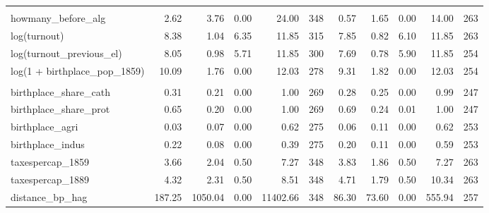 \begin{table}[!h]
\begin{threeparttable}
{\begin{tabular}[t]{lrrrrrrrrrr}
\addlinespace[0.3em]
\multicolumn{11}{l}{\textbf{Panel C: Election Characteristics}}\\
\hspace{1em}howmany\_before\_alg & \num{2.62} & \num{3.76} & \num{0.00} & \num{24.00} & 348 & \num{0.57} & \num{1.65} & \num{0.00} & \num{14.00} & 263\\
\hspace{1em}log(turnout) & \num{8.38} & \num{1.04} & \num{6.35} & \num{11.85} & 315 & \num{7.85} & \num{0.82} & \num{6.10} & \num{11.85} & 263\\
\hspace{1em}log(turnout\_previous\_el) & \num{8.05} & \num{0.98} & \num{5.71} & \num{11.85} & 300 & \num{7.69} & \num{0.78} & \num{5.90} & \num{11.85} & 254\\
\hspace{1em}log(1 + birthplace\_pop\_1859) & \num{10.09} & \num{1.76} & \num{0.00} & \num{12.03} & 278 & \num{9.31} & \num{1.82} & \num{0.00} & \num{12.03} & 254\\
\addlinespace[0.3em]
\multicolumn{11}{l}{\textbf{Panel D: Birthplace Characteristics}}\\
\hspace{1em}birthplace\_share\_cath & \num{0.31} & \num{0.21} & \num{0.00} & \num{1.00} & 269 & \num{0.28} & \num{0.25} & \num{0.00} & \num{0.99} & 247\\
\hspace{1em}birthplace\_share\_prot & \num{0.65} & \num{0.20} & \num{0.00} & \num{1.00} & 269 & \num{0.69} & \num{0.24} & \num{0.01} & \num{1.00} & 247\\
\hspace{1em}birthplace\_agri & \num{0.03} & \num{0.07} & \num{0.00} & \num{0.62} & 275 & \num{0.06} & \num{0.11} & \num{0.00} & \num{0.62} & 253\\
\hspace{1em}birthplace\_indus & \num{0.22} & \num{0.08} & \num{0.00} & \num{0.39} & 275 & \num{0.20} & \num{0.11} & \num{0.00} & \num{0.59} & 253\\
\hspace{1em}taxespercap\_1859 & \num{3.66} & \num{2.04} & \num{0.50} & \num{7.27} & 348 & \num{3.83} & \num{1.86} & \num{0.50} & \num{7.27} & 263\\
\hspace{1em}taxespercap\_1889 & \num{4.32} & \num{2.31} & \num{0.50} & \num{8.51} & 348 & \num{4.71} & \num{1.79} & \num{0.50} & \num{10.34} & 263\\
\hspace{1em}distance\_bp\_hag & \num{187.25} & \num{1050.04} & \num{0.00} & \num{11402.66} & 348 & \num{86.30} & \num{73.60} & \num{0.00} & \num{555.94} & 257\\

\end{tabular}}
\end{threeparttable}
\end{table}
